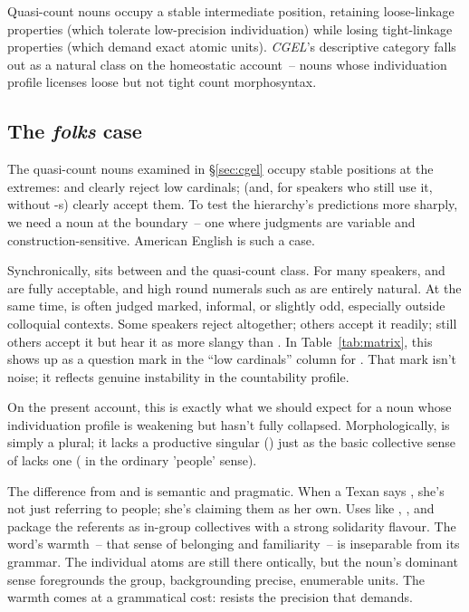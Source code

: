 \documentclass[12pt,a4paper]{article}
\begin{document}
Quasi-count nouns occupy a stable intermediate position, retaining loose-linkage properties (which tolerate low-precision individuation) while losing tight-linkage properties (which demand exact atomic units). \textit{CGEL}'s descriptive category falls out as a natural class on the homeostatic account~-- nouns whose individuation profile licenses loose but not tight count morphosyntax.

\subsection{The \textit{folks} case}\label{sec:folks}

The quasi-count nouns examined in \S\ref{sec:cgel} occupy stable positions at the extremes:  and  clearly reject low cardinals;  (and, for speakers who still use it,  without -s) clearly accept them. To test the hierarchy's predictions more sharply, we need a noun at the boundary~-- one where judgments are variable and construction-sensitive. American English  is such a case.

Synchronically,  sits between  and the quasi-count class. For many speakers,  and  are fully acceptable, and high round numerals such as  are entirely natural. At the same time,  is often judged marked, informal, or slightly odd, especially outside colloquial contexts. Some speakers reject  altogether; others accept it readily; still others accept it but hear it as more slangy than . In Table~\ref{tab:matrix}, this shows up as a question mark in the \enquote{low cardinals} column for . That mark isn't noise; it reflects genuine instability in the countability profile.

On the present account, this is exactly what we should expect for a noun whose individuation profile is weakening but hasn't fully collapsed. Morphologically,  is simply a plural; it lacks a productive singular () just as the basic collective sense of  lacks one ( in the ordinary 'people' sense).

The difference from  and  is semantic and pragmatic. When a Texan says , she's not just referring to people; she's claiming them as her own. Uses like , , and  package the referents as in-group collectives with a strong solidarity flavour. The word's warmth~-- that sense of belonging and familiarity~-- is inseparable from its grammar. The individual atoms are still there ontically, but the noun's dominant sense foregrounds the group, backgrounding precise, enumerable units. The warmth comes at a grammatical cost:  resists the precision that  demands.
\end{document}
